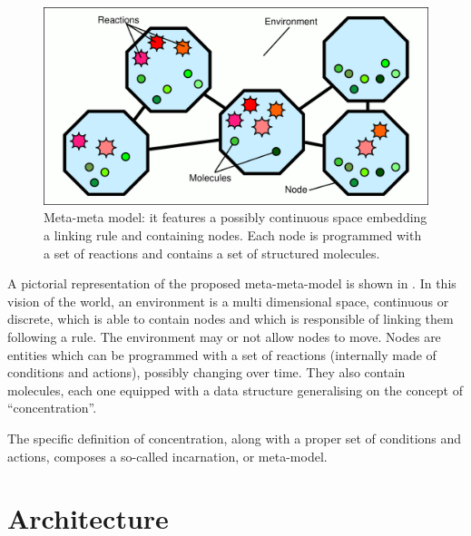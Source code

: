\documentclass[12pt,a4paper,twoside,openright]{book}
\begin{document}
\label{model}
\begin{figure}%
  \begin{center}
    \includegraphics[width=0.99\columnwidth]{img/model.pdf}
    \caption[\alchemist{} computational model]{Meta-meta model: it features a possibly continuous space embedding a linking rule and containing nodes. Each node is programmed with a set of reactions and contains a set of structured molecules.}
    \label{img:model}
  \end{center}
\end{figure}

A pictorial representation of the proposed meta-meta-model is shown in .
%
In this vision of the world, an environment is a multi dimensional space, continuous or discrete, which is able to contain nodes and which is responsible of linking them following a rule.
%
The environment may or not allow nodes to move.
%
Nodes are entities which can be programmed with a set of reactions (internally made of conditions and actions), possibly changing over time.
%
They also contain molecules, each one equipped with a data structure generalising on the concept of ``concentration''.

The specific definition of concentration, along with a proper set of conditions and actions, composes a so-called incarnation, or meta-model.

\chapter{Architecture}
\end{document}
